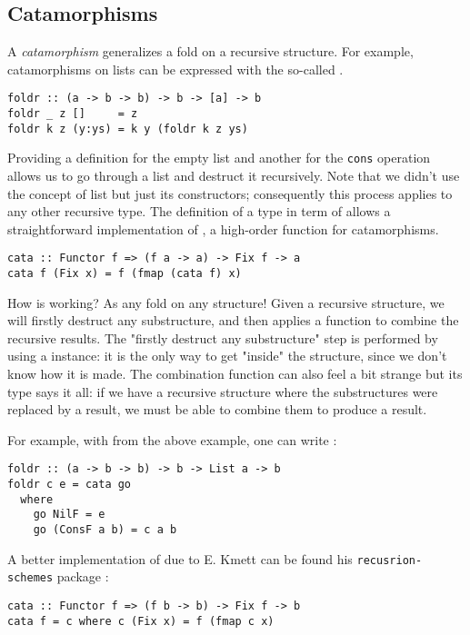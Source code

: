 \subsection{Catamorphisms}
A \emph{catamorphism} generalizes a fold on a recursive structure. For example, catamorphisms on lists can be expressed with the so-called .
\begin{verbatim}
foldr :: (a -> b -> b) -> b -> [a] -> b
foldr _ z []     = z
foldr k z (y:ys) = k y (foldr k z ys)
\end{verbatim}
Providing a definition for the empty list and another for the \verb|cons| operation allows us to go through a list and destruct it recursively. Note that we didn't use the concept of list but just its constructors; consequently this process applies to any other recursive type. The definition of a type in term of  allows a straightforward implementation of , a high-order function for catamorphisms.

\begin{verbatim}
cata :: Functor f => (f a -> a) -> Fix f -> a
cata f (Fix x) = f (fmap (cata f) x)
\end{verbatim}
\noindent How  is working? As any fold on any structure! Given a recursive structure, we will firstly destruct any substructure, and then applies a function to combine the recursive results. The "firstly destruct any substructure" step is performed by using a  instance: it is the only way to get "inside" the structure, since we don't know how it is made. The combination function can also feel a bit strange but its type says it all: if we have a recursive structure where the substructures were replaced by a result, we must be able to combine them to produce a result.

For example, with  from the above example, one can write :
\begin{verbatim}
foldr :: (a -> b -> b) -> b -> List a -> b
foldr c e = cata go
  where
    go NilF = e
    go (ConsF a b) = c a b
\end{verbatim}

\noindent A better implementation of  due to E. Kmett can be found his \verb|recusrion-schemes| package \cite{ekmett:eschems}:

\begin{verbatim}
cata :: Functor f => (f b -> b) -> Fix f -> b
cata f = c where c (Fix x) = f (fmap c x)
\end{verbatim}

